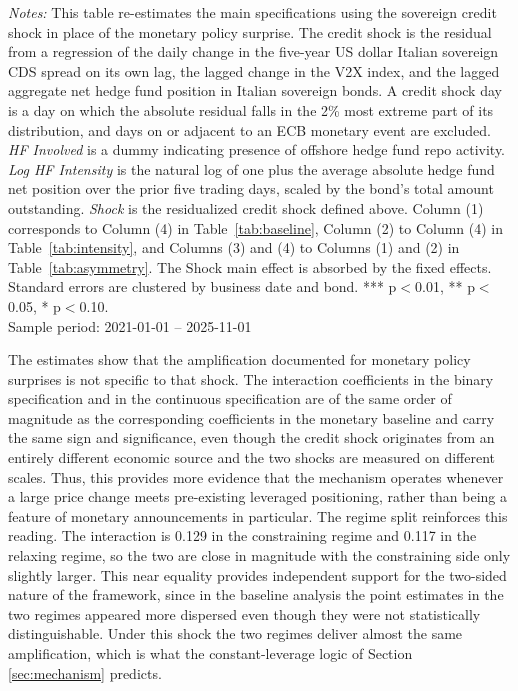 \documentclass[english, 11pt, oneside]{article}
\begin{document}
\begin{table}[t]
\vspace{1ex}
\raggedright\scriptsize
\textit{Notes:} This table re-estimates the main specifications using the sovereign credit shock in place of the monetary policy surprise. The credit shock is the residual from a regression of the daily change in the five-year US dollar Italian sovereign CDS spread on its own lag, the lagged change in the V2X index, and the lagged aggregate net hedge fund position in Italian sovereign bonds. A credit shock day is a day on which the absolute residual falls in the 2\% most extreme part of its distribution, and days on or adjacent to an ECB monetary event are excluded. \textit{HF Involved} is a dummy indicating presence of offshore hedge fund repo activity. \textit{Log HF Intensity} is the natural log of one plus the average absolute hedge fund net position over the prior five trading days, scaled by the bond's total amount outstanding. \textit{Shock} is the residualized credit shock defined above. Column (1) corresponds to Column (4) in Table~\ref{tab:baseline}, Column (2) to Column (4) in Table~\ref{tab:intensity}, and Columns (3) and (4) to Columns (1) and (2) in Table~\ref{tab:asymmetry}. The Shock main effect is absorbed by the fixed effects. Standard errors are clustered by business date and bond. *** p$<$0.01, ** p$<$0.05, * p$<$0.10. \\ Sample period: 2021-01-01 -- 2025-11-01
\end{table}


The estimates show that the amplification documented for monetary policy surprises is not specific to that shock. The interaction coefficients in the binary specification and in the continuous specification are of the same order of magnitude as the corresponding coefficients in the monetary baseline and carry the same sign and significance, even though the credit shock originates from an entirely different economic source and the two shocks are measured on different scales. Thus, this provides more evidence that the mechanism operates whenever a large price change meets pre-existing leveraged positioning, rather than being a feature of monetary announcements in particular. The regime split reinforces this reading. The interaction is 0.129 in the constraining regime and 0.117 in the relaxing regime, so the two are close in magnitude with the constraining side only slightly larger. This near equality provides independent support for the two-sided nature of the framework, since in the baseline analysis the point estimates in the two regimes appeared more dispersed even though they were not statistically distinguishable. Under this shock the two regimes deliver almost the same amplification, which is what the constant-leverage logic of Section \ref{sec:mechanism} predicts.
\end{document}
